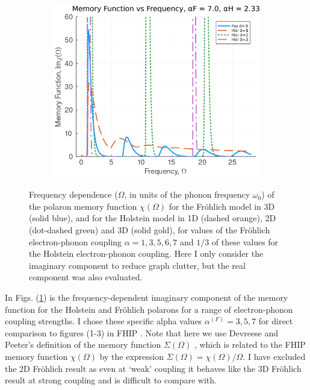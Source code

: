 \begin{figure}
\begin{subfigure}[b]{0.49\textwidth}
  \end{subfigure}
  \begin{subfigure}[b]{0.49\textwidth}
    \centering
    \includegraphics[width=\textwidth]{figures/im_mem_freq_7_233.png}
  \end{subfigure}
  \caption{Frequency dependence ($\Omega$, in units of the phonon frequency $\omega_0$) of the polaron memory function $\chi(\Omega)$ for the Fr\"ohlich model in 3D (solid blue), and for the Holstein model in 1D (dashed orange), 2D (dot-dashed green) and 3D (solid gold), for values of the Fr\"ohlich electron-phonon coupling $\alpha = 1, 3, 5,6, 7$ and $1/3$ of these values for the Holstein electron-phonon coupling. Here I only consider the imaginary component to reduce graph clutter, but the real component was also evaluated.} 
  \label{fig:im_mem_freq}
\end{figure}

In Figs. (\ref{fig:im_mem_freq}) is the frequency-dependent imaginary component of the memory function for the Holstein and Fr\"ohlich polarons for a range of electron-phonon coupling strengths. I chose these specific alpha values $\alpha^{(F)} = 3, 5, 7$ for direct comparison to figures (1-3) in FHIP \cite{Feynman1962}. Note that here we use Devreese and Peeter's definition of the memory function $\Sigma(\Omega)$ \cite{Peeters1984}, which is related to the FHIP memory function $\chi(\Omega)$ by the expression $\Sigma(\Omega) = \chi(\Omega) / \Omega$. I have excluded the 2D Fr\"ohlich result as even at `weak' coupling it behaves like the 3D Fr\"ohlich result at strong coupling and is difficult to compare with.
\newline

